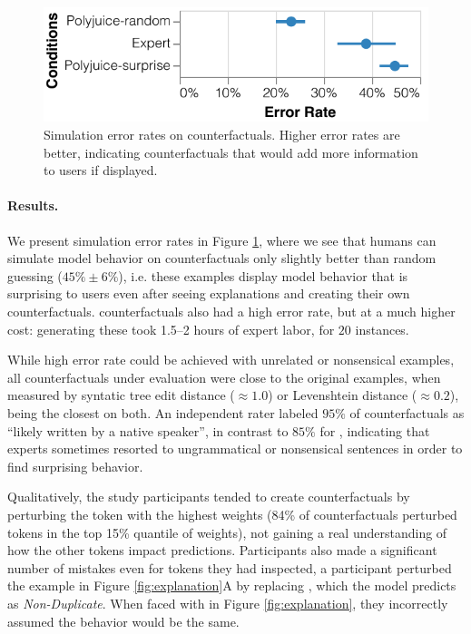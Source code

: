 \begin{figure}[t]
\centering
\includegraphics[width=1\columnwidth]{figures/err_rate.pdf}
\vspace{-15pt}
\caption{
Simulation error rates on counterfactuals. Higher error rates are better, indicating counterfactuals that would add more information to users if displayed.
}
\vspace{-10pt}
\label{fig:err_rate}
\end{figure}

\paragraph{Results.}
We present simulation error rates in Figure \ref{fig:err_rate}, where we see that humans can simulate model behavior on \cshap counterfactuals only slightly better than random guessing ($45\%\pm6\%$), i.e. these examples display model behavior that is surprising to users even after seeing explanations and creating their own counterfactuals. \chuman counterfactuals also had a high error rate, but at a much higher cost: generating these took 1.5--2 hours of expert labor, for $20$ instances.

While high error rate could be achieved with unrelated or nonsensical examples, all counterfactuals under evaluation were close to the original examples, when measured by syntatic tree edit distance (${\approx}1.0$) or Levenshtein distance (${\approx}0.2$), \cshap being the closest on both. An independent rater labeled $95\%$ of \cshap counterfactuals as ``likely written by a native speaker'', in contrast to $85\%$ for \chuman, indicating that experts sometimes resorted to ungrammatical or nonsensical sentences in order to find surprising behavior.

Qualitatively, the study participants tended to create counterfactuals by perturbing the token with the highest weights (84\% of counterfactuals perturbed tokens in the top 15\% quantile of weights), not gaining a real understanding of how the other tokens impact predictions. Participants also made a significant number of mistakes even for tokens they had inspected, \eg a participant perturbed the example in Figure \ref{fig:explanation}A by replacing , which the model predicts as \emph{Non-Duplicate}. When faced with  in Figure \ref{fig:explanation}, they incorrectly assumed the behavior would be the same.

